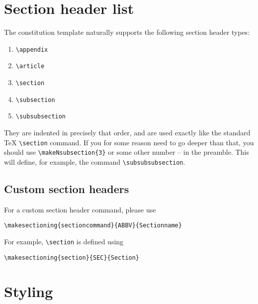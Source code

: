 \documentclass{constitution}
\begin{document}
\section{Section header list}
The constitution template naturally supports the following section header types:
\begin{enumerate}
    \item \verb|\appendix|
    \item \verb|\article|
    \item \verb|\section|
    \item \verb|\subsection|
    \item \verb|\subsubsection|
\end{enumerate}
They are indented in precisely that order, and are used exactly like the standard TeX \verb|\section| command.
If you for some reason need to go deeper than that, you should use \verb|\makeNsubsection{3}| or some other number -- in the preamble.
This will define, for example, the command \verb|\subsubsubsection|.

\subsection{Custom section headers}
For a custom section header command, please use\par
\quad \verb|\makesectioning{sectioncommand}{ABBV}{Sectionname}|\par
For example, \verb|\section| is defined using\par
\quad \verb|\makesectioning{section}{SEC}{Section}|

\section{Styling}
\end{document}
